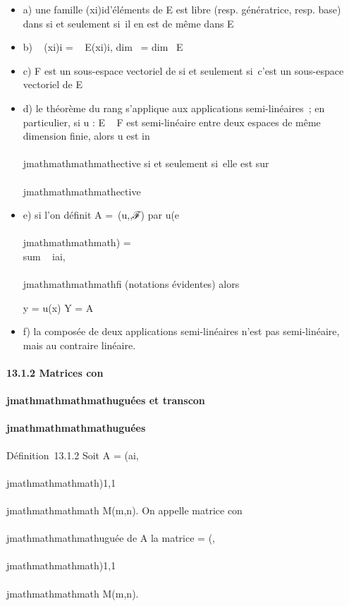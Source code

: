 \begin{itemize}
\item
  a) une famille (xi)i\inI d'éléments de E est libre
  (resp. génératrice, resp. base) dans \checkE si et
  seulement si~il en est de même dans E
\item
  b) \mathrmrg~
  \checkE(xi)i\inI
  = \mathrmrg~
  E(xi)i\inI, dim~
  \checkE = dim~ E
\item
  c) F est un sous-espace vectoriel de \checkE si et
  seulement si~c'est un sous-espace vectoriel de E
\item
  d) le théorème du rang s'applique aux applications semi-linéaires~; en
  particulier, si u : E \rightarrow~ F est semi-linéaire entre deux espaces de même
  dimension finie, alors u est in\\\\jmathmathmathmathective si et seulement si~elle est
  sur\\\\jmathmathmathmathective
\item
  e) si l'on définit A =\
  \mathrmMat (u,,ℱ) par u(e\\\\jmathmathmathmath)
  = \\sum ~
  iai,\\\\jmathmathmathmathfi (notations évidentes) alors

  y = u(x) \Leftrightarrow Y =
  A\overlineX
\item
  f) la composée de deux applications semi-linéaires n'est pas
  semi-linéaire, mais au contraire linéaire.
\end{itemize}

\paragraph{13.1.2 Matrices con\\\\jmathmathmathmathuguées et transcon\\\\jmathmathmathmathuguées}

Définition~13.1.2 Soit A = (ai,\\\\jmathmathmathmath)1\leqi\leqm,1\leq\\\\jmathmathmathmath\leqn \in
M\mathbb{C}(m,n). On appelle matrice con\\\\jmathmathmathmathuguée de A la matrice
\overlineA =
(\overlineai,\\\\jmathmathmathmath)1\leqi\leqm,1\leq\\\\jmathmathmathmath\leqn \in
M\mathbb{C}(m,n).


